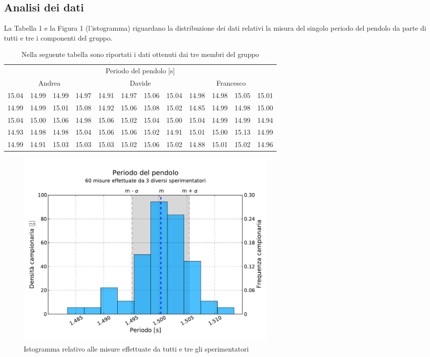 \documentclass[12pt, twoside, a4paper]{article}
\begin{document}
	\subsection{Analisi dei dati}
La Tabella 1 e la Figura 1 (l'istogramma) riguardano la distribuzione dei dati relativi la misura del singolo periodo del pendolo da parte di tutti e tre i componenti del gruppo.\\

\begin{table}[bht]
	\begin{tabular} {c c c c | c c c c | c c c c}
		\toprule
		\multicolumn{12}{c}{Periodo del pendolo [s]} \\
		\multicolumn{4}{c}{Andrea} & \multicolumn{4}{c}{Davide} & \multicolumn{4}{c}{Francesco} \\
		\midrule
		15.04 & 14.99 & 14.99 & 14.97 & 14.91 & 14.97 & 15.06 & 15.04 & 14.98 & 14.98 & 15.05 & 15.01 \\
		14.99 & 14.99 & 15.01 & 15.08 & 14.92 & 15.06 & 15.08 & 15.02 & 14.85 & 14.99 & 14.98 & 15.00 \\
		15.04 & 15.00 & 15.06 & 14.98 & 15.06 & 15.02 & 15.04 & 15.00 & 15.04 & 14.99 & 14.99 & 14.94 \\
		14.93 & 14.98 & 14.98 & 15.04 & 15.06 & 15.06 & 15.02 & 14.91 & 15.01 & 15.00 & 15.13 & 14.99 \\
		14.99 & 14.91 & 15.03 & 15.03 & 15.03 & 15.02 & 15.06 & 15.02 & 14.88 & 15.01 & 15.02 & 14.96 \\
		\bottomrule
	\end{tabular}
	\caption{Nella seguente tabella sono riportati i dati ottenuti dai tre membri del gruppo }
\end{table}

\begin{figure}
	\centering
	\includegraphics[width=130mm]{Pendolo.pdf}
	\caption{Istogramma relativo alle misure effettuate da tutti e tre gli sperimentatori}
\end{figure}
\end{document}
